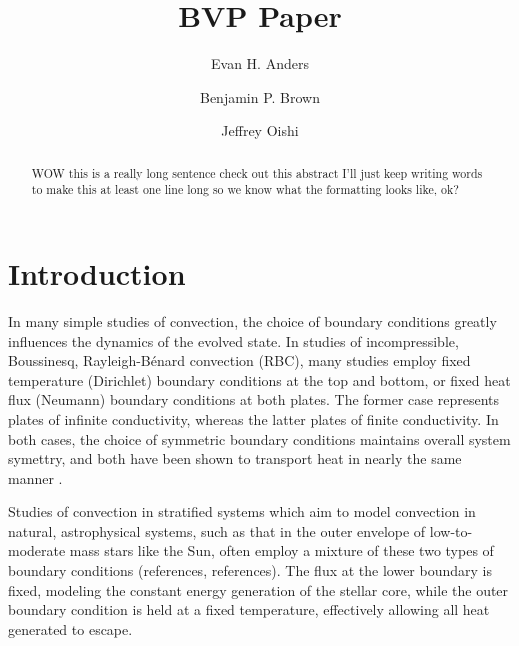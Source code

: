 \documentclass[aps, pre, onecolumn, nofootinbib, notitlepage, groupedaddress, amsfonts, amssymb, amsmath, longbibliography]{revtex4-1}
\newcommand{\RB}{Rayleigh-B\'{e}nard }
\begin{document}
\author{Evan H. Anders}
\author{Benjamin P. Brown}
\author{Jeffrey Oishi}
\title{BVP Paper}

\begin{abstract}
WOW this is a really long sentence check out this abstract I'll just keep writing words to make this at least
one line long so we know what the formatting looks like, ok?
\end{abstract}
\maketitle


\section{Introduction}
\label{sec:intro}
In many simple studies of convection, the choice of boundary conditions greatly influences the dynamics
of the evolved state.  In studies of incompressible, Boussinesq, \RB convection (RBC), many studies
employ fixed temperature (Dirichlet) boundary conditions at the top and bottom, or fixed heat flux
(Neumann) boundary conditions at both plates.  The former case represents plates of infinite conductivity,
whereas the latter plates of finite conductivity.  In both cases, the choice of symmetric boundary
conditions maintains overall system symettry, and both have been shown to transport heat in nearly the
same manner \cite{johnston&doering2009}.

Studies of convection in stratified systems which aim to model convection in natural, astrophysical systems,
such as that in the outer envelope of low-to-moderate mass stars like the Sun, often employ a mixture of these
two types of boundary conditions (references, references).  The flux at the lower boundary is fixed, modeling
the constant energy generation of the stellar core, while the outer boundary condition is held at a fixed temperature,
effectively allowing all heat generated to escape.  
\end{document}
